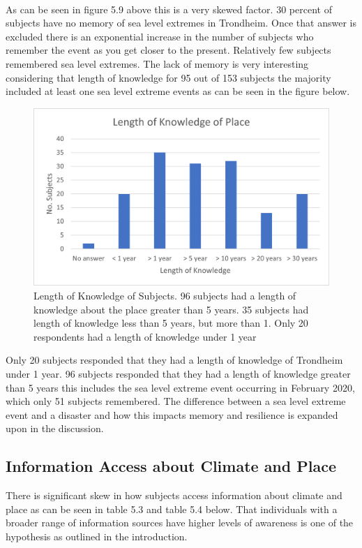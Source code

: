\paragraph{}

As can be seen in figure 5.9 above this is a very skewed factor. 30 percent of subjects have no memory of sea level extremes in Trondheim. Once that answer is excluded there is an exponential increase in the number of subjects who remember the event as you get closer to the present. Relatively few subjects remembered sea level extremes. The lack of memory is very interesting considering that length of knowledge for 95 out of 153 subjects the majority included at least one sea level extreme events as can be seen in the figure below. 

\begin{figure}[h!]
    \centering
    \includegraphics{fig_results/long_know.png}
    \caption{Length of Knowledge of Subjects. 96 subjects had a length of knowledge about the place greater than 5 years. 35 subjects had length of knowledge less than 5 years, but more than 1. Only 20 respondents had a length of knowledge under 1 year}
    \label{fig:long_know}
\end{figure}

Only 20 subjects responded that they had a length of knowledge of Trondheim under 1 year. 96 subjects responded that they had a length of knowledge greater than 5 years this includes the sea level extreme event occurring in February 2020, which only 51 subjects remembered. The difference between a sea level extreme event and a disaster and how this impacts memory and resilience is expanded upon in the discussion.


\subsection{Information Access about Climate and Place}
There is significant skew in how subjects access information about climate and place as can be seen in table 5.3 and table 5.4 below. That individuals with a broader range of information sources have higher levels of awareness is one of the hypothesis as outlined in the introduction. 

